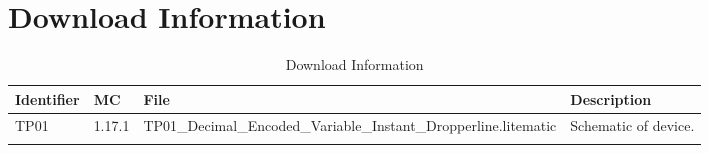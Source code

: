 \documentclass[10pt]{datasheet}
\begin{document}
\section{Download Information}
\begin{table}[h]
    \caption{Download Information}
    \begin{tabularx}{\textwidth}{l | l | l | X}
        \thickhline
        \textbf{Identifier} & \textbf{MC} & \textbf{File} & \textbf{Description} \\
        \hline
        TP01 & 1.17.1 & TP01\_Decimal\_Encoded\_Variable\_Instant\_Dropperline.litematic & Schematic of device. \\
        \hline
        \thickhline
    \end{tabularx}
\end{table}
\end{document}
